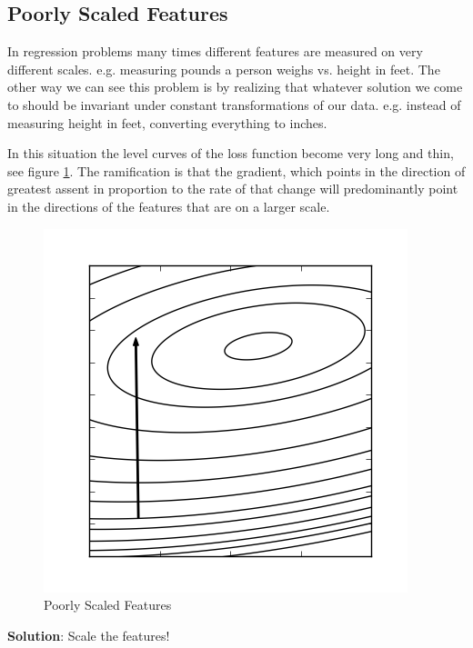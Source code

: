 \documentclass[a4paper, 12pt]{article}
\begin{document}
\subsection*{Poorly Scaled Features}

In regression problems many times different features are measured on very different scales. e.g. measuring pounds a person weighs vs. height in feet. The other way we can see this problem is by realizing that whatever solution we come to should be invariant under constant transformations of our data. e.g. instead of measuring height in feet, converting everything to inches.

\vspace{1pc}

In this situation the level curves of the loss function become very long and thin, see figure \ref{fig:scaling_problems}. The ramification is that the gradient, which points in the direction of greatest assent in proportion to the rate of that change will predominantly point in the directions of the features that are on a larger scale.

\begin{figure}[H]
  \centering
    \includegraphics[scale=1]{images/scaling_problems.png}
  \caption{Poorly Scaled Features} \label{fig:scaling_problems}
\end{figure}

\vspace{1pc}

\textbf{Solution}: Scale the features!

\vspace{1pc}
\end{document}
